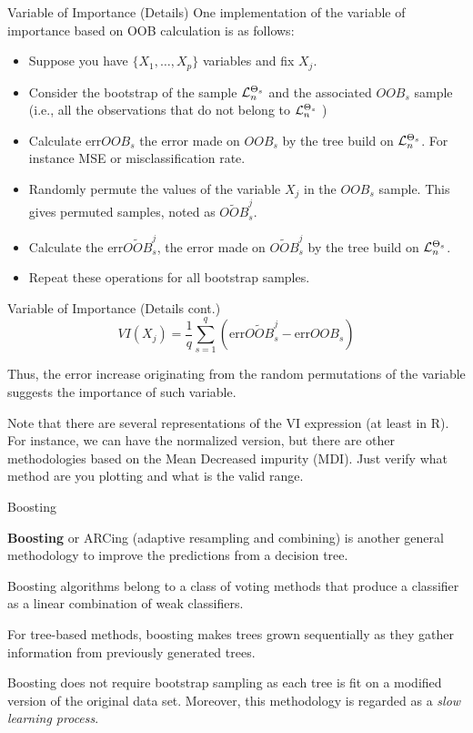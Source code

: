 \documentclass{beamer}
\begin{document}
\begin{frame}{Variable of Importance (Details)}
	One implementation of the variable of importance based on OOB calculation is as follows:
	\begin{itemize}
		\item Suppose you have $\{X_1, \ldots, X_p\}$ variables and fix $X_j$. 
		\item Consider the bootstrap of the sample ${\cal L}_n^{\Theta_s}$ and the associated $OOB_s$ sample (i.e., all the observations that do not belong to ${\cal L}_n^{\Theta_s}$ )
		\item Calculate $\text{err}OOB_s$ the error made on $OOB_s$ by the tree build on ${\cal L}_n^{\Theta_s}$. For instance MSE or misclassification rate.
		\item Randomly permute the values of the variable $X_j$ in the $OOB_s$ sample. This gives permuted samples, noted as $\widetilde{OOB}_s^j$.
		\item Calculate the $\text{err}\widetilde{OOB}_s^j$, the error made on $\widetilde{OOB}_s^j$ by the tree build on ${\cal L}_n^{\Theta_s}$.
		\item Repeat these operations for all bootstrap samples. 
\end{itemize}
		
\end{frame}

\begin{frame}{Variable of Importance (Details cont.)}
	\begin{equation*}
		VI(X_j)= \frac{1}{q} \sum_{s=1}^q (\text{err}\widetilde{OOB}_s^j- \text{err}OOB_s)
	\end{equation*}	

Thus, the error increase originating from the random permutations of the variable suggests the importance of such variable. 

Note that there are several representations of the VI expression (at least in R). For instance, we can have the normalized version, but there are other methodologies based on the Mean Decreased impurity (MDI). Just verify what method are you plotting and what is the valid range. 

\end{frame}
	

\begin{frame}{Boosting}
	
	{\bf Boosting} or ARCing (adaptive resampling and combining) is another general methodology to improve the predictions from a decision tree.
	
	Boosting algorithms belong to a class of voting methods that produce a classifier as a linear combination of weak classifiers.
	 
	For tree-based methods, boosting makes trees grown sequentially as they gather information from previously generated trees. 
	
	
 Boosting does not require bootstrap sampling as each tree is fit on a modified version of the original data set.
 Moreover, this methodology is regarded as a \textit{slow learning process}. 
 
 
	
\end{frame}
\end{document}
